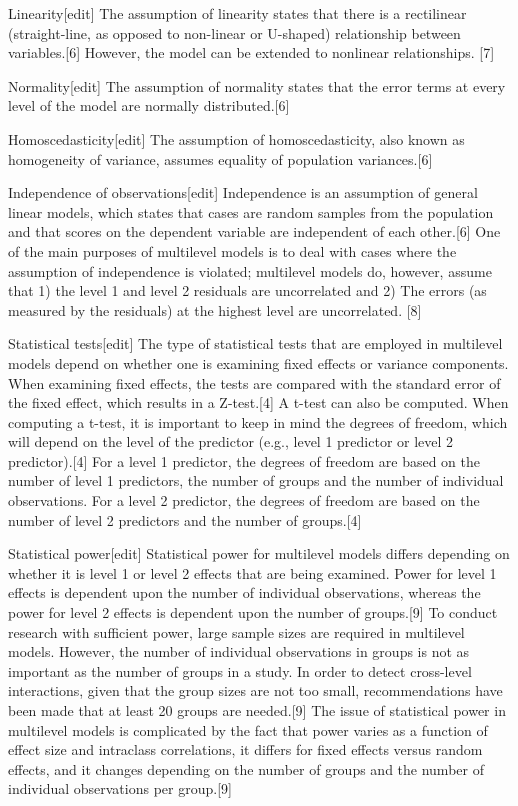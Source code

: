 Linearity[edit]
The assumption of linearity states that there is a rectilinear (straight-line, as opposed to non-linear or U-shaped) relationship between variables.[6] However, the model can be extended to nonlinear relationships. [7]

Normality[edit]
The assumption of normality states that the error terms at every level of the model are normally distributed.[6]

Homoscedasticity[edit]
The assumption of homoscedasticity, also known as homogeneity of variance, assumes equality of population variances.[6]

Independence of observations[edit]
Independence is an assumption of general linear models, which states that cases are random samples from the population and that scores on the dependent variable are independent of each other.[6] One of the main purposes of multilevel models is to deal with cases where the assumption of independence is violated; multilevel models do, however, assume that 1) the level 1 and level 2 residuals are uncorrelated and 2) The errors (as measured by the residuals) at the highest level are uncorrelated. [8]

Statistical tests[edit]
The type of statistical tests that are employed in multilevel models depend on whether one is examining fixed effects or variance components. When examining fixed effects, the tests are compared with the standard error of the fixed effect, which results in a Z-test.[4] A t-test can also be computed. When computing a t-test, it is important to keep in mind the degrees of freedom, which will depend on the level of the predictor (e.g., level 1 predictor or level 2 predictor).[4] For a level 1 predictor, the degrees of freedom are based on the number of level 1 predictors, the number of groups and the number of individual observations. For a level 2 predictor, the degrees of freedom are based on the number of level 2 predictors and the number of groups.[4]

Statistical power[edit]
Statistical power for multilevel models differs depending on whether it is level 1 or level 2 effects that are being examined. Power for level 1 effects is dependent upon the number of individual observations, whereas the power for level 2 effects is dependent upon the number of groups.[9] To conduct research with sufficient power, large sample sizes are required in multilevel models. However, the number of individual observations in groups is not as important as the number of groups in a study. In order to detect cross-level interactions, given that the group sizes are not too small, recommendations have been made that at least 20 groups are needed.[9] The issue of statistical power in multilevel models is complicated by the fact that power varies as a function of effect size and intraclass correlations, it differs for fixed effects versus random effects, and it changes depending on the number of groups and the number of individual observations per group.[9]

